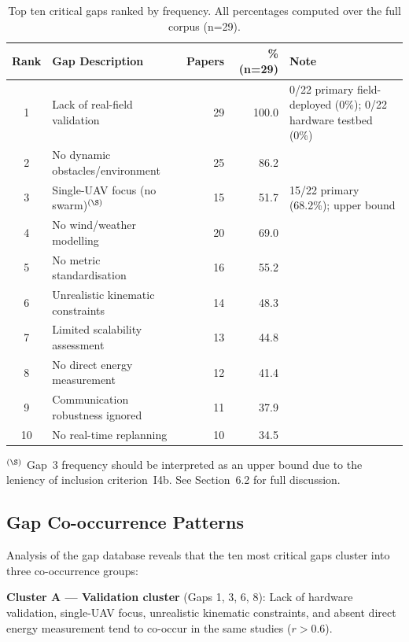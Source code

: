 \documentclass[review,3p]{elsarticle}
\begin{document}
\begin{table}[htbp]
\centering
\caption{Top ten critical gaps ranked by frequency. All percentages computed
over the full corpus (n=29).}
\label{tab:top10}
\begin{tabular}{clrrp{5cm}}
\toprule
\textbf{Rank} & \textbf{Gap Description} & \textbf{Papers} & \textbf{\% (n=29)} & \textbf{Note} \\
\midrule
1  & Lack of real-field validation        & 29 & 100.0 & 0/22 primary field-deployed (0\%); 0/22 hardware testbed (0\%) \\
2  & No dynamic obstacles/environment     & 25 & 86.2  & \\
3  & Single-UAV focus (no swarm)$^{(\S)}$ & 15 & 51.7  & 15/22 primary (68.2\%); upper bound \\
4  & No wind/weather modelling            & 20 & 69.0  & \\
5  & No metric standardisation            & 16 & 55.2  & \\
6  & Unrealistic kinematic constraints    & 14 & 48.3  & \\
7  & Limited scalability assessment       & 13 & 44.8  & \\
8  & No direct energy measurement         & 12 & 41.4  & \\
9  & Communication robustness ignored     & 11 & 37.9  & \\
10 & No real-time replanning              & 10 & 34.5  & \\
\bottomrule
\end{tabular}
\begin{minipage}{0.96\textwidth}
\scriptsize\medskip
$^{(\S)}$ Gap~3 frequency should be interpreted as an upper bound due to the
leniency of inclusion criterion~I4b. See Section~6.2 for full discussion.
\end{minipage}
\end{table}

\subsection{Gap Co-occurrence Patterns}

Analysis of the gap database reveals that the ten most critical gaps cluster
into three co-occurrence groups:

\textbf{Cluster A --- Validation cluster} (Gaps 1, 3, 6, 8): Lack of hardware
validation, single-UAV focus, unrealistic kinematic constraints, and absent
direct energy measurement tend to co-occur in the same studies ($r > 0.6$).
\end{document}
